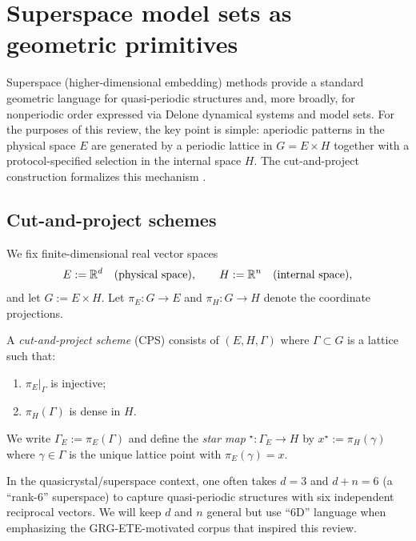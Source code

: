 \section{Superspace model sets as geometric primitives}\label{sec:superspace}

Superspace (higher-dimensional embedding) methods provide a standard geometric language for quasi-periodic structures and, more broadly, for nonperiodic order expressed via Delone dynamical systems and model sets. For the purposes of this review, the key point is simple: aperiodic patterns in the physical space $E$ are generated by a periodic lattice in $G=E\times H$ together with a protocol-specified selection in the internal space $H$. The cut-and-project construction formalizes this mechanism \cite{Meyer1972,Moody2000,Schlottmann2000GeneralizedModelSets,BaakeGrimm2013,LagariasPleasants2003RepetitiveDelone}.

\subsection{Cut-and-project schemes}\label{sec:superspace:cps}

We fix finite-dimensional real vector spaces
\[
E := \mathbb{R}^{d} \quad (\text{physical space}),\qquad
H := \mathbb{R}^{n} \quad (\text{internal space}),
\]
and let $G := E \times H$. Let $\pi_E : G \to E$ and $\pi_H : G \to H$ denote the coordinate projections.

\begin{definition}\label{def:cps}
A \emph{cut-and-project scheme} (CPS) consists of $(E,H,\Gamma)$ where $\Gamma \subset G$ is a lattice such that:
\begin{enumerate}[label=(\roman*),leftmargin=*,itemsep=2pt]
  \item $\pi_E|_{\Gamma}$ is injective;
  \item $\pi_H(\Gamma)$ is dense in $H$.
\end{enumerate}
We write $\Gamma_E := \pi_E(\Gamma)$ and define the \emph{star map} ${}^\star : \Gamma_E \to H$ by $x^\star := \pi_H(\gamma)$ where $\gamma \in \Gamma$ is the unique lattice point with $\pi_E(\gamma)=x$.
\end{definition}

In the quasicrystal/superspace context, one often takes $d=3$ and $d+n=6$ (a ``rank-6'' superspace) to capture quasi-periodic structures with six independent reciprocal vectors. We will keep $d$ and $n$ general but use ``6D'' language when emphasizing the GRG-ETE-motivated corpus that inspired this review.

